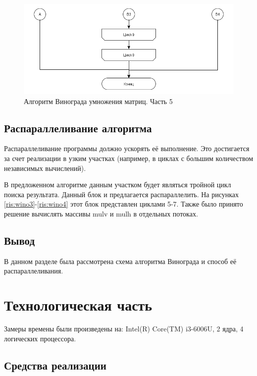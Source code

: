 \documentclass[a4paper,12pt]{report}
\begin{document}
		\newpage
		
		\begin{figure}[h!]
			\centering
			\includegraphics[width=0.8\linewidth]{part51.png}
			\caption{Алгоритм Винограда умножения матриц. Часть 5}
			\label{ris:wino5}
		\end{figure}
	
	\section{Распараллеливание алгоритма}

			Распараллеливание программы должно ускорять её выполнение.
			Это достигается за счет реализации в узким участках (например, в циклах с большим количеством независимых вычислений).
			
			В предложенном алгоритме данным участком будет являться тройной цикл поиска результата.
			Данный блок и предлагается распараллелить. На рисунках \ref{ris:wino3}-\ref{ris:wino4} этот блок представлен циклами 5-7. Также было принято решение вычислять массивы mulv и mulh в отдельных потоках.

	\section{Вывод}

			В данном разделе была рассмотрена схема алгоритма Винограда и способ её распараллеливания.

    \newpage

    \chapter{Технологическая часть}
        \label{sec:tecnologic_part}

        	Замеры времены были произведены на: Intel(R) Core(TM) i3-6006U, 2 ядра, 4 логических процессора.

	\section{Средства реализации}
\end{document}
